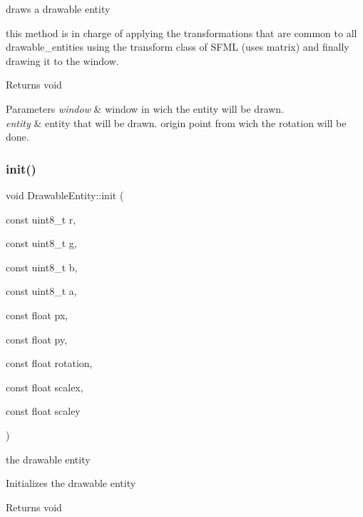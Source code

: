 draws a drawable entity 

this method is in charge of applying the transformations that are common to all drawable\+\_\+entities using the transform class of S\+F\+ML (uses matrix) and finally drawing it to the window.

\begin{DoxyReturn}{Returns}
void 
\end{DoxyReturn}

\begin{DoxyParams}{Parameters}
{\em window} & window in wich the entity will be drawn. \\
\hline
{\em entity} & entity that will be drawn.  origin point from wich the rotation will be done. \\
\hline
\end{DoxyParams}
\mbox{\label{class_drawable_entity_a3893879bf0710a7f5c5e7eb758ad7e96}} 
\subsubsection{\texorpdfstring{init()}{init()}}
{\footnotesize\ttfamily void Drawable\+Entity\+::init (\begin{DoxyParamCaption}\item[{const uint8\+\_\+t}]{r,  }\item[{const uint8\+\_\+t}]{g,  }\item[{const uint8\+\_\+t}]{b,  }\item[{const uint8\+\_\+t}]{a,  }\item[{const float}]{px,  }\item[{const float}]{py,  }\item[{const float}]{rotation,  }\item[{const float}]{scalex,  }\item[{const float}]{scaley }\end{DoxyParamCaption})}

the drawable entity

Initializes the drawable entity

\begin{DoxyReturn}{Returns}
void 
\end{DoxyReturn}

